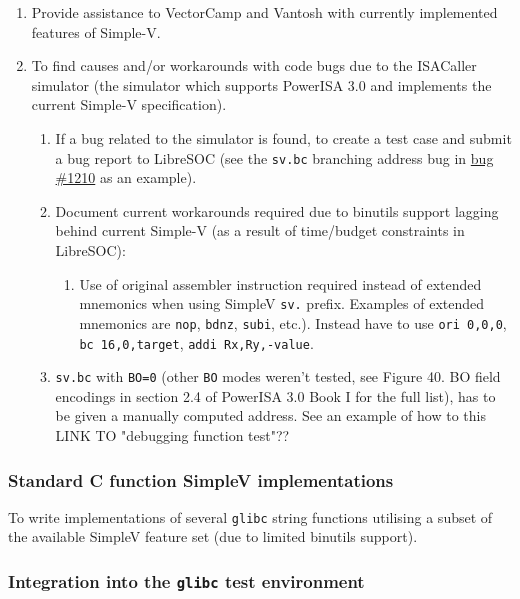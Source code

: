 \begin{enumerate}
  \item Provide assistance to VectorCamp and Vantosh with currently implemented
features of Simple-V.
  \item To find causes and/or workarounds with code bugs due to the ISACaller
simulator (the simulator which supports PowerISA 3.0 and implements the current
Simple-V specification).
  \begin{enumerate}
    \item If a bug related to the simulator is found, to create a test
  case and submit a bug report to LibreSOC (see the \texttt{sv.bc} branching address
  bug in \href{https://bugs.libre-soc.org/show_bug.cgi?id=1210}{bug \#1210}
  as an example).
    \item Document current workarounds required due to binutils support lagging
  behind current Simple-V (as a result of time/budget constraints in LibreSOC):
    \begin{enumerate}
      \item  Use of original assembler instruction required instead of
      extended mnemonics when using SimpleV \texttt{sv.} prefix.
      Examples of extended mnemonics are \texttt{nop}, \texttt{bdnz},
      \texttt{subi}, etc.). Instead have to use
      \texttt{ori 0,0,0}, \texttt{bc 16,0,target}, \texttt{addi Rx,Ry,-value}.
    \end{enumerate}
    \item \texttt{sv.bc} with \texttt{BO=0} (other \texttt{BO} modes weren't tested, see
  Figure 40. BO field encodings in section 2.4 of PowerISA 3.0 Book I
  for the full list), has to be given a manually computed address.
  See an example of how to this LINK TO "debugging function test"??
  \end{enumerate}
\end{enumerate}

\subsubsection{Standard C function SimpleV implementations}

To write implementations of several \texttt{glibc} string functions utilising a subset
of the available SimpleV feature set (due to limited binutils support).

\subsubsection{Integration into the \texttt{glibc} test environment}

